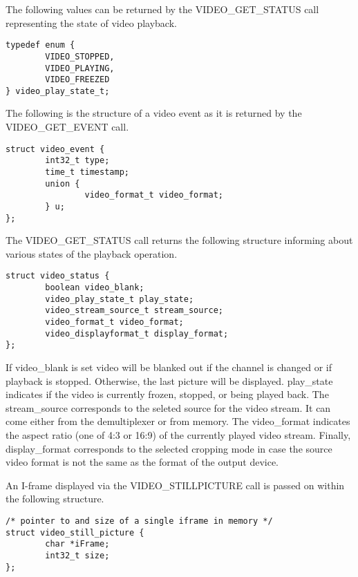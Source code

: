 \label{videoplaystate}
The following values can be returned by the VIDEO\_GET\_STATUS call
representing the state of video playback.
\begin{verbatim}
typedef enum {
        VIDEO_STOPPED, 
        VIDEO_PLAYING, 
        VIDEO_FREEZED  
} video_play_state_t; 
\end{verbatim}


\label{videoevent}
The following is the structure of a video event as it is returned by
the VIDEO\_GET\_EVENT call.
\begin{verbatim}
struct video_event { 
        int32_t type; 
        time_t timestamp;
        union { 
                video_format_t video_format;
        } u; 
};
\end{verbatim}

\label{videostatus}
The VIDEO\_GET\_STATUS call returns the following structure informing
about various states of the playback operation.
\begin{verbatim}
struct video_status { 
        boolean video_blank;                 
        video_play_state_t play_state;         
        video_stream_source_t stream_source;
        video_format_t video_format;
        video_displayformat_t display_format; 
};
\end{verbatim}
If video\_blank is set video will be blanked out if the channel is changed or
if playback is stopped. Otherwise, the last picture will be displayed.
play\_state indicates if the video is currently frozen, stopped, or
being played back. The stream\_source corresponds to the seleted source 
for the video stream. It can come either from the demultiplexer or from memory.
The video\_format indicates the aspect ratio (one of 4:3 or 16:9)
of the currently played video stream.
Finally, display\_format corresponds to the selected cropping mode in case the 
source video format is not the same as the format of the output device.


\label{videostill}
An I-frame displayed via the VIDEO\_STILLPICTURE call is passed on
within the following structure.
\begin{verbatim}
/* pointer to and size of a single iframe in memory */
struct video_still_picture { 
        char *iFrame; 
        int32_t size; 
};
\end{verbatim}

